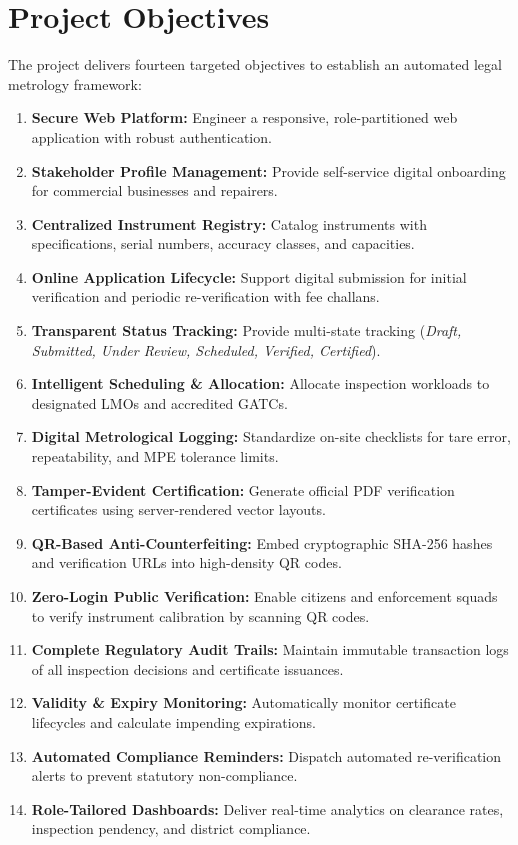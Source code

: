 \documentclass[11pt,a4paper]{article}
\begin{document}
\newpage

\section{Project Objectives}
The project delivers fourteen targeted objectives to establish an automated legal metrology framework:
\begin{enumerate}
    \item \textbf{Secure Web Platform:} Engineer a responsive, role-partitioned web application with robust authentication.
    \item \textbf{Stakeholder Profile Management:} Provide self-service digital onboarding for commercial businesses and repairers.
    \item \textbf{Centralized Instrument Registry:} Catalog instruments with specifications, serial numbers, accuracy classes, and capacities.
    \item \textbf{Online Application Lifecycle:} Support digital submission for initial verification and periodic re-verification with fee challans.
    \item \textbf{Transparent Status Tracking:} Provide multi-state tracking (\textit{Draft, Submitted, Under Review, Scheduled, Verified, Certified}).
    \item \textbf{Intelligent Scheduling \& Allocation:} Allocate inspection workloads to designated LMOs and accredited GATCs.
    \item \textbf{Digital Metrological Logging:} Standardize on-site checklists for tare error, repeatability, and MPE tolerance limits.
    \item \textbf{Tamper-Evident Certification:} Generate official PDF verification certificates using server-rendered vector layouts.
    \item \textbf{QR-Based Anti-Counterfeiting:} Embed cryptographic SHA-256 hashes and verification URLs into high-density QR codes.
    \item \textbf{Zero-Login Public Verification:} Enable citizens and enforcement squads to verify instrument calibration by scanning QR codes.
    \item \textbf{Complete Regulatory Audit Trails:} Maintain immutable transaction logs of all inspection decisions and certificate issuances.
    \item \textbf{Validity \& Expiry Monitoring:} Automatically monitor certificate lifecycles and calculate impending expirations.
    \item \textbf{Automated Compliance Reminders:} Dispatch automated re-verification alerts to prevent statutory non-compliance.
    \item \textbf{Role-Tailored Dashboards:} Deliver real-time analytics on clearance rates, inspection pendency, and district compliance.
\end{enumerate}
\end{document}
